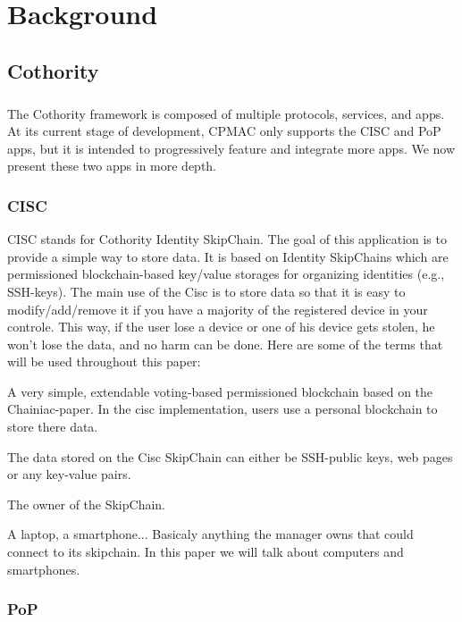 \chapter{Background}
\section{Cothority}

\paragraph{}
The Cothority framework is composed of multiple protocols, services, and apps. At its current stage of development, CPMAC only supports the CISC and PoP apps, but it is intended to progressively feature and integrate more apps. We now present these two apps in more depth.

\subsection{CISC}

CISC stands for Cothority Identity SkipChain. The goal of this application is to provide a simple way to store data. It is based on Identity SkipChains which are permissioned blockchain-based key/value storages for organizing identities (e.g., SSH-keys). The main use of the Cisc is to store data so that it is easy to modify/add/remove it if you have a majority of the registered device in your controle. This way, if the user lose a device or one of his device gets stolen, he won't lose the data, and no harm can be done. Here are some of the terms that will be used throughout this paper:
\begin{description}[style=nextline]
\item[SkipChain] A very simple, extendable voting-based permissioned blockchain based on the Chainiac-paper. In the cisc implementation, users use a personal blockchain to store there data.
\item[Data] The data stored on the Cisc SkipChain can either be SSH-public keys, web pages or any key-value pairs.
\item[Manager] The owner of the SkipChain.
\item[Device] A laptop, a smartphone... Basicaly anything the manager owns that could connect to its skipchain. In this paper we will talk about computers and smartphones.
\end{description}

\subsection{PoP}

